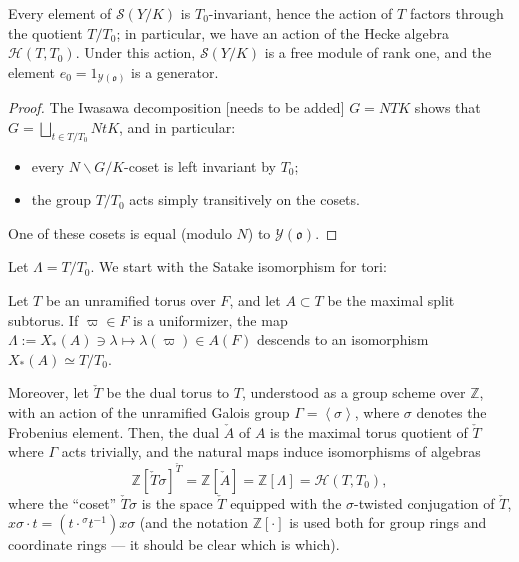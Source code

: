 \begin{lemma}
 \label{lemma-torus-module}
 Every element of $\mathcal S(Y/K)$ is $T_0$-invariant, hence the action of $T$ factors through the quotient $T/T_0$; in particular, we have an action of the Hecke algebra $\mathcal H(T,T_0)$. Under this action, $\mathcal S(Y/K)$ is a free module of rank one, and the element $e_0 = 1_{\mathcal Y(\mathfrak o)}$ is a generator.
\end{lemma}

\begin{proof}
 The Iwasawa decomposition [needs to be added] $G = N T K$ shows that $G = \bigsqcup_{t\in T/T_0} N t K$, and in particular: 
 \begin{itemize}
  \item every $N\backslash G/K$-coset is left invariant by $T_0$;
  \item the group $T/T_0$ acts simply transitively on the cosets.
\end{itemize}
One of these cosets is equal (modulo $N$) to $\mathcal Y(\mathfrak o)$.
\end{proof}

Let $\Lambda = T/T_0$.  We start with the Satake isomorphism for tori:

\begin{proposition}
 \label{proposition-Satake-torus}
Let $T$ be an unramified torus over $F$, and let $A\subset T$ be the maximal split subtorus. If $\varpi \in F$ is a uniformizer, the map $\Lambda:=X_*(A)\ni \lambda\mapsto \lambda(\varpi) \in A(F)$ descends to an isomorphism $X_*(A)\simeq T/T_0$. 

Moreover, let $\check T$ be the dual torus to $T$, understood as a group scheme over $\mathbb Z$, with an action of the unramified Galois group $\Gamma = \left< \sigma \right>$, where $\sigma$ denotes the Frobenius element. Then, the dual $\check A$ of $A$ is the maximal torus quotient of $\check T$ where $\Gamma$ acts trivially, and the natural maps induce isomorphisms of algebras
\begin{equation}
 \label{equation-Satake-torus}
 \mathbb Z[\check T \sigma]^{\check T} = \mathbb Z[\check A] = \mathbb Z[\Lambda] = \mathcal H(T,T_0),
\end{equation}
where the ``coset'' $\check T \sigma$ is the space $\check T$ equipped with the $\sigma$-twisted conjugation of $\check T$, $x\sigma \cdot t = (t\cdot {^\sigma t^{-1}}) x \sigma$
(and the notation $\mathbb Z[\cdot]$ is used both for group rings and coordinate rings --- it should be clear which is which).
\end{proposition}

